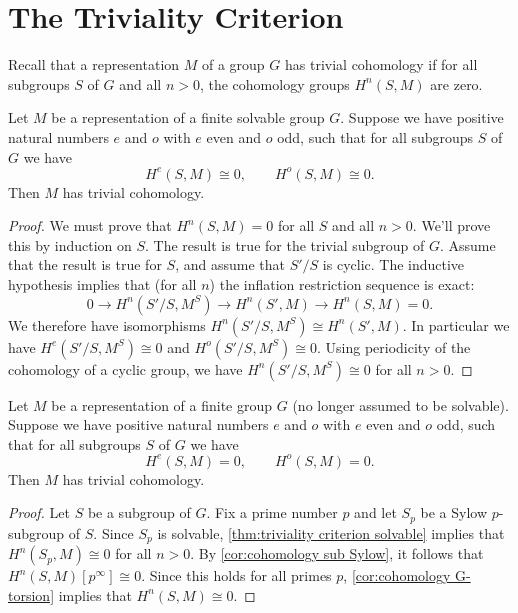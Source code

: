 \section{The Triviality Criterion}

Recall that a representation $M$ of a group $G$ has trivial cohomology if for all subgroups $S$ of
$G$ and all $n > 0$, the cohomology groups $H^{n}(S,M)$ are zero.

\begin{theorem} \label{thm:triviality criterion solvable}
	Let $M$ be a representation of a finite solvable group $G$.
	Suppose we have positive natural numbers $e$ and $o$ with $e$ even and $o$ odd,
	such that for all subgroups $S$ of $G$ we have
	\[
		H^e(S,M) \cong 0, \qquad H^o(S,M) \cong 0.
	\]
	Then $M$ has trivial cohomology.
\end{theorem}

\begin{proof}
	We must prove that $H^{n}(S,M) = 0$ for all $S$ and all $n > 0$.
	We'll prove this by induction on $S$. The result is true for the trivial subgroup of $G$.
	Assume that the result is true for $S$, and assume that $S' / S$ is cyclic.
	The inductive hypothesis implies that (for all $n$) the inflation restriction sequence is exact:
	\[
		0 \to H^{n} (S'/S, M^S) \to H^{n}(S' , M) \to H^{n}(S,M)= 0.
	\]
	We therefore have isomorphisms $H^{n} (S'/S, M^S) \cong H^{n}(S' , M)$.
	In particular we have $H^{e} (S'/S, M^S) \cong 0$ and $H^{o} (S'/S, M^S) \cong 0$.
	Using periodicity of the cohomology of a cyclic group, we have $H^{n}(S'/S,M^S) \cong 0$
	for all $n>0$.
\end{proof}

\begin{theorem} \label{thm:triviality criterion}
	Let $M$ be a representation of a finite group $G$ (no longer assumed to be solvable).
	Suppose we have positive natural numbers $e$ and $o$ with $e$ even and $o$ odd, such that for all
	subgroups $S$ of $G$ we have
	\[
		H^e(S,M) =0, \qquad H^o(S,M) = 0.
	\]
	Then $M$ has trivial cohomology.
\end{theorem}

\begin{proof}
	Let $S$ be a subgroup of $G$.
	Fix a prime number $p$ and let $S_p$ be a Sylow $p$-subgroup of $S$.
	Since $S_p$ is solvable, \ref{thm:triviality criterion solvable} implies that
	$H^n(S_p,M) \cong 0$ for all $n > 0$.
	By \ref{cor:cohomology sub Sylow}, it follows that $H^n(S,M)[p^\infty] \cong 0$.
	Since this holds for all primes $p$,
	\ref{cor:cohomology G-torsion} implies that $H^n(S,M) \cong 0$.
\end{proof}

